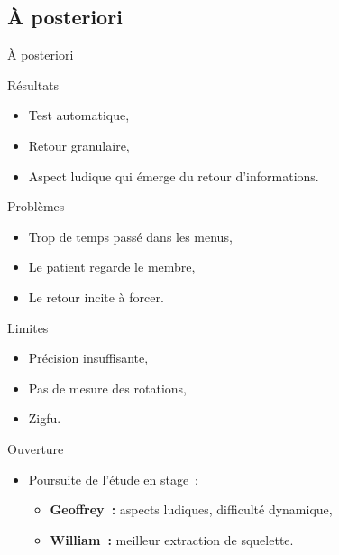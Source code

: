 \subsection{À posteriori}
\begin{frame}{À posteriori}
{
  \begin{block}{Résultats}
  \begin{itemize}
  \item Test automatique,
  \item Retour granulaire,
  \item Aspect ludique qui émerge du retour d'informations.
  \end{itemize}
  \end{block}
}
{
  \begin{alertblock}{Problèmes}
  \begin{itemize}
  \item Trop de temps passé dans les menus,
  \item Le patient regarde le membre,
  \item Le retour incite à forcer.
  \end{itemize}
  \end{alertblock}
}
{
  \begin{alertblock}{Limites}
  \begin{itemize}
  \item Précision insuffisante,
  \item Pas de mesure des rotations,
  \item Zigfu.
  \end{itemize}
  \end{alertblock}
}
{
  \begin{block}{Ouverture}
  \begin{itemize}
  \item Poursuite de l'étude en stage~:
  \begin{itemize}
  \item \textbf{Geoffrey~:} aspects ludiques, difficulté dynamique,
  \item \textbf{William~:} meilleur extraction de squelette. 
  \end{itemize}
  \end{itemize}
  \end{block}
}

\end{frame}